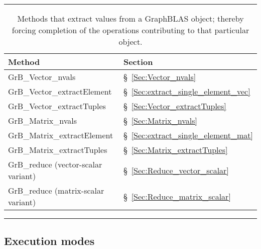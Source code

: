 \begin{table}[htb]
	\hrule
	\begin{center}
		\caption{Methods that extract values from a GraphBLAS object; thereby
		forcing completion of the operations contributing to that particular object.}
		\label{Tab:ExtractMethods}

		\begin{tabular}{l|l}
			Method	& Section \\ \hline

			{\sf GrB\_Vector\_nvals}		& \S~\ref{Sec:Vector_nvals}		\\
			{\sf GrB\_Vector\_extractElement} 	& \S~\ref{Sec:extract_single_element_vec}	\\
			{\sf GrB\_Vector\_extractTuples}	& \S~\ref{Sec:Vector_extractTuples}	\\
			{\sf GrB\_Matrix\_nvals}		& \S~\ref{Sec:Matrix_nvals}		\\
			{\sf GrB\_Matrix\_extractElement} 	& \S~\ref{Sec:extract_single_element_mat}	\\
			{\sf GrB\_Matrix\_extractTuples}	& \S~\ref{Sec:Matrix_extractTuples}	\\
			{\sf GrB\_reduce} (vector-scalar variant)		& \S~\ref{Sec:Reduce_vector_scalar}		\\
			{\sf GrB\_reduce} (matrix-scalar variant)		& \S~\ref{Sec:Reduce_matrix_scalar}		\\
		\end{tabular}
	\end{center}
	\hrule
\end{table}

\subsection{Execution modes}

